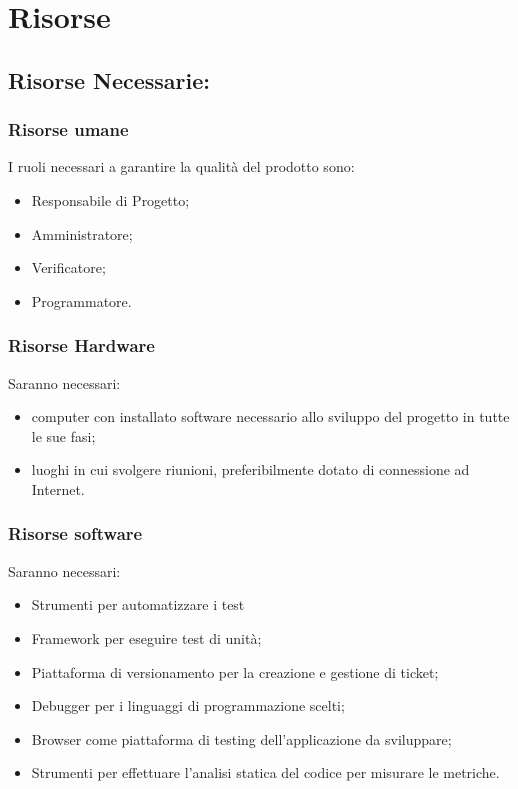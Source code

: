 \section{Risorse}


\subsection{Risorse Necessarie:}


\subsubsection{Risorse umane}

I ruoli necessari a garantire la qualità del prodotto sono:
\begin{itemize}
\item Responsabile di Progetto;
\item Amministratore;
\item Verificatore;
\item Programmatore. 
\end{itemize}

\subsubsection{Risorse Hardware}

Saranno necessari:
\begin{itemize}
\item computer con installato software necessario allo sviluppo del progetto in tutte le sue fasi;
\item luoghi in cui svolgere riunioni, preferibilmente dotato di connessione ad Internet.
\end{itemize}

\subsubsection{Risorse software}

Saranno necessari:
\begin{itemize}
\item Strumenti per automatizzare i test
\item Framework per eseguire test di unità;
\item Piattaforma di versionamento per la creazione e gestione di ticket;
\item Debugger per i linguaggi di programmazione scelti;
\item Browser come piattaforma di testing dell'applicazione da sviluppare;
\item Strumenti per effettuare l'analisi statica del codice per misurare le metriche.
\end{itemize}


